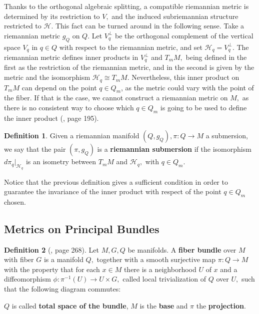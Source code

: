 \documentclass[12pt, letterpaper, reqno]{amsart}
\theoremstyle{definition}
\newtheorem{df}{Definition}
\theoremstyle{plain}
\theoremstyle{remark}
\begin{document}
Thanks to the orthogonal algebraic splitting, a compatible riemannian metric is determined by its restriction to $ V, $ and the induced subriemannian structure restricted to $ \mathcal{H} $. This fact can be turned around in the following sense. Take a riemannian metric $ g_Q $ on $ Q. $ Let $ V_q^\perp $ be the orthogonal complement of the vertical space $ V_q $ in $ q\in Q $ with respect to the riemannian metric, and set $ \mathcal{H}_q=V_q^\perp. $ The riemannian metric defines inner products in $ V_q^\perp $  and $ T_mM, $ being defined in the first as the restriction of the riemannian metric, and in the second is given by the metric and the isomorphism $ \mathcal{H}_q\cong T_mM. $ Nevertheless, this inner product on $ T_mM $ can depend on the point $ q\in Q_m $, as the metric could vary with the point of the fiber. If that is the case, we cannot construct a riemannian metric on $ M, $ as there is no consistent way to choose which $ q\in Q_m $ is going to be used to define the inner product (\cite{montgomery2002tour}, page 195).

\begin{df}
	Given a riemannian manifold $ (Q, g_Q), \pi: Q \rightarrow {M}
	$ a submersion, we say that the pair $ (\pi, g_Q) $ is a \textbf{riemannian submersion} if the isomorphism $ d\pi_q |_{\mathcal{H}_q} $ is an isometry between $ T_m M $ and $ \mathcal{H}_q ,$ with $ q\in Q_m $. 
\end{df}

Notice that the previous definition gives a sufficient condition in order to guarantee the invariance of the inner product with respect of the point $ q\in Q_m $ chosen. 

\subsection{Metrics on Principal Bundles}%
\label{sub:metrics_on_principal_bundles}

\begin{df}[\cite{lee2003introduction}, page 268]
Let $ M, G, Q $ be manifolds. A \textbf{fiber bundle} over $ M $ with fiber $ G $ is a manifold $ Q, $ together with a smooth surjective map $ \pi: Q \rightarrow {M}
$ with the property that for each $ x\in M $ there is a neighborhood $ U $ of $ x $ and a diffeomorphism $ \phi:\pi^{-1}(U) \rightarrow {U\times G,}
 $ called local trivialization of $ Q $ over $ U, $ such that the following diagram commutes:
 \begin{center}
 \end{center}
 $ Q $ is called \textbf{total space of the bundle}, $ M $ is the \textbf{base} and $ \pi $ the \textbf{projection}.   
\end{df}
\end{document}

